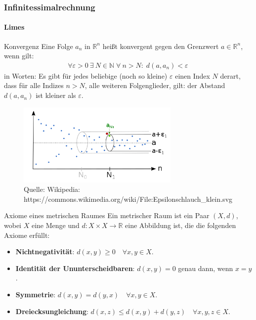 \documentclass{beamer}
\begin{document}
 \begin{frame}
    \frametitle{Infinitessimalrechnung}
\framesubtitle{Limes}

\begin{block}{Konvergenz}
    Eine Folge $a_n$ in $\mathbb{R}^n$ heißt konvergent gegen den Grenzwert $a \in \mathbb{R}^n$, wenn gilt:
    \begin{align*}
    \forall {\varepsilon > 0} \ \exists \ N \in \mathbb{N} \; \forall \ n > N: \; d(a, a_n) < \varepsilon\,
    \end{align*}
    in Worten: Es gibt für jedes beliebige (noch so kleine) $\varepsilon$ einen Index $N$ derart, dass für alle Indizes $n > N$, alle weiteren Folgenglieder, gilt: der Abstand $d(a, a_n)$ ist kleiner als $\varepsilon$.
    \end{block}


\begin{figure}[H]
      \centering
    \includegraphics[width=0.7\textwidth]{images/500px-Epsilonschlauch_klein}
      \caption{Quelle: Wikipedia: https://commons.wikimedia.org/wiki/File:Epsilonschlauch\_klein.svg}
\end{figure}

 \end{frame}




\begin{frame}{Axiome eines metrischen Raumes}
    Ein metrischer Raum ist ein Paar \((X, d)\), wobei \( X \) eine Menge und \( d: X \times X \rightarrow \mathbb{R} \) eine Abbildung ist, die die folgenden Axiome erfüllt:
    \begin{itemize}
      \item \textbf{Nichtnegativität}: \( d(x, y) \geq 0 \quad \forall x, y \in X \).
      \item \textbf{Identität der Ununterscheidbaren}: \( d(x, y) = 0 \) genau dann, wenn \( x = y \).
      \item \textbf{Symmetrie}: \( d(x, y) = d(y, x) \quad \forall x, y \in X \).
      \item \textbf{Dreiecksungleichung}: \( d(x, z) \leq d(x, y) + d(y, z) \quad \forall x, y, z \in X \).
    \end{itemize}
  \end{frame}
  
\end{document}
